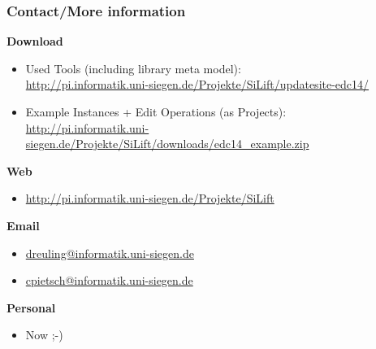   \begin{frame}
 \frametitle{Contact/More information}
 \textbf{Download}
 \begin{itemize}
   \item Used Tools (including library meta model): \\
  \url{http://pi.informatik.uni-siegen.de/Projekte/SiLift/updatesite-edc14/}
  \item Example Instances + Edit Operations (as Projects): \\
    \url{http://pi.informatik.uni-siegen.de/Projekte/SiLift/downloads/edc14_example.zip}
 \end{itemize}
  \textbf{Web}
  \begin{itemize}
    \item \url{http://pi.informatik.uni-siegen.de/Projekte/SiLift}
  \end{itemize}
  \textbf{Email}
  \begin{itemize}
    \item \url{dreuling@informatik.uni-siegen.de} 
    \item \url{cpietsch@informatik.uni-siegen.de} 
  \end{itemize}
  \textbf{Personal}
  \begin{itemize}
    \item Now ;-)
  \end{itemize}
  \end{frame}
